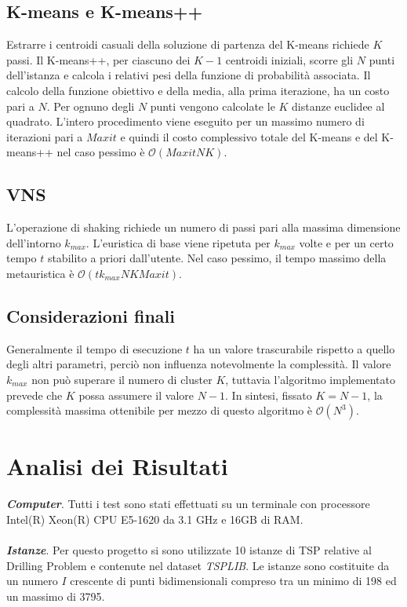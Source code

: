 \documentclass[12pt,a4paper,oneside,hidelinks]{report}
\begin{document}
\subsection*{K-means e K-means++}
Estrarre i centroidi casuali della soluzione di partenza del K-means richiede $K$ passi.
Il K-means++, per ciascuno dei $K-1$ centroidi iniziali, scorre gli $N$ punti dell'istanza e calcola i relativi pesi della funzione di probabilità associata.
Il calcolo della funzione obiettivo e della media, alla prima iterazione, ha un costo pari a $N$.
Per ognuno degli $N$ punti vengono calcolate le $K$ distanze euclidee al quadrato. L'intero procedimento viene eseguito per un massimo numero di iterazioni pari a $Maxit$ e quindi il costo complessivo totale del K-means e del K-means++ nel caso pessimo è $\mathcal{O}(Maxit N K)$.

\subsection*{VNS}
L'operazione di shaking richiede un numero di passi pari alla massima dimensione dell'intorno $k_{max}$.
L'euristica di base viene ripetuta per $k_{max}$ volte e per un certo tempo $t$ stabilito a priori dall'utente.
Nel caso pessimo, il tempo massimo della metauristica è $\mathcal{O}(t k_{max} N K Maxit)$.

\subsection*{Considerazioni finali}
Generalmente il tempo di esecuzione $t$ ha un valore trascurabile rispetto a quello degli altri parametri, perciò non influenza notevolmente la complessità. Il valore $k_{max}$ non può superare il numero di cluster $K$, tuttavia l'algoritmo implementato prevede che $K$ possa assumere il valore $N - 1$. 
In sintesi, fissato $K = N - 1$, la complessità massima ottenibile per mezzo di questo algoritmo è $\mathcal{O}(N^3)$.

\section*{Analisi dei Risultati}
\textbf{\textit{Computer}}. Tutti i test sono stati effettuati su un terminale con processore Intel(R) Xeon(R) CPU E5-1620 da 3.1 GHz e 16GB di RAM.

\paragraph*{}
\textbf{\textit{Istanze}}. Per questo progetto si sono utilizzate 10 istanze di TSP relative al Drilling Problem e contenute nel dataset \textit{TSPLIB}. Le istanze sono costituite da un numero $I$ crescente di punti bidimensionali compreso tra un minimo di 198 ed un massimo di 3795.
\end{document}
